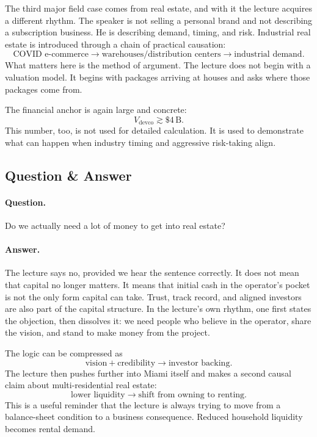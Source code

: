 The third major field case comes from real estate, and with it the lecture acquires a different rhythm. The speaker is not selling a personal brand and not describing a subscription business. He is describing demand, timing, and risk. Industrial real estate is introduced through a chain of practical causation:
\begin{equation}
\text{COVID e-commerce} \to \text{warehouses/distribution centers} \to \text{industrial demand}.
\end{equation}
What matters here is the method of argument. The lecture does not begin with a valuation model. It begins with packages arriving at houses and asks where those packages come from.

The financial anchor is again large and concrete:
\begin{equation}
V_{\mathrm{devco}} \gtrsim \$4\,\mathrm{B}.
\end{equation}
This number, too, is not used for detailed calculation. It is used to demonstrate what can happen when industry timing and aggressive risk-taking align.

\subsection{Question \& Answer}

\paragraph{Question.} Do we actually need a lot of money to get into real estate?

\paragraph{Answer.} The lecture says no, provided we hear the sentence correctly. It does not mean that capital no longer matters. It means that initial cash in the operator's pocket is not the only form capital can take. Trust, track record, and aligned investors are also part of the capital structure. In the lecture's own rhythm, one first states the objection, then dissolves it: we need people who believe in the operator, share the vision, and stand to make money from the project.

The logic can be compressed as
\begin{equation}
\text{vision} + \text{credibility} \to \text{investor backing}.
\end{equation}
The lecture then pushes further into Miami itself and makes a second causal claim about multi-residential real estate:
\begin{equation}
\text{lower liquidity} \to \text{shift from owning to renting}.
\end{equation}
This is a useful reminder that the lecture is always trying to move from a balance-sheet condition to a business consequence. Reduced household liquidity becomes rental demand.

